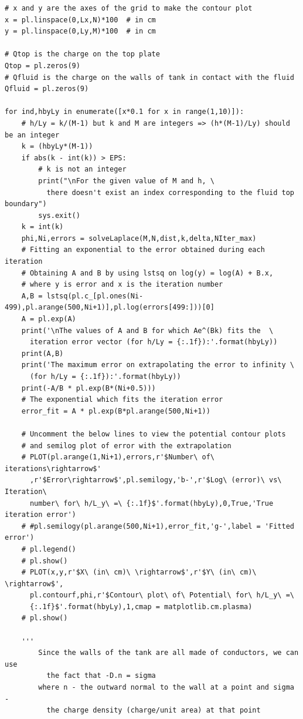 \documentclass[11pt, a4paper]{article}
\begin{document}
\begin{verbatim}
# x and y are the axes of the grid to make the contour plot
x = pl.linspace(0,Lx,N)*100  # in cm
y = pl.linspace(0,Ly,M)*100  # in cm

# Qtop is the charge on the top plate
Qtop = pl.zeros(9)
# Qfluid is the charge on the walls of tank in contact with the fluid
Qfluid = pl.zeros(9)

for ind,hbyLy in enumerate([x*0.1 for x in range(1,10)]):
    # h/Ly = k/(M-1) but k and M are integers => (h*(M-1)/Ly) should be an integer
    k = (hbyLy*(M-1))
    if abs(k - int(k)) > EPS:
        # k is not an integer
        print("\nFor the given value of M and h, \
          there doesn't exist an index corresponding to the fluid top boundary")
        sys.exit()
    k = int(k)
    phi,Ni,errors = solveLaplace(M,N,dist,k,delta,NIter_max)
    # Fitting an exponential to the error obtained during each iteration
    # Obtaining A and B by using lstsq on log(y) = log(A) + B.x,  
    # where y is error and x is the iteration number
    A,B = lstsq(pl.c_[pl.ones(Ni-499),pl.arange(500,Ni+1)],pl.log(errors[499:]))[0]
    A = pl.exp(A)
    print('\nThe values of A and B for which Ae^(Bk) fits the  \
      iteration error vector (for h/Ly = {:.1f}):'.format(hbyLy))
    print(A,B)
    print('The maximum error on extrapolating the error to infinity \
      (for h/Ly = {:.1f}):'.format(hbyLy))
    print(-A/B * pl.exp(B*(Ni+0.5)))
    # The exponential which fits the iteration error
    error_fit = A * pl.exp(B*pl.arange(500,Ni+1))

    # Uncomment the below lines to view the potential contour plots 
    # and semilog plot of error with the extrapolation
    # PLOT(pl.arange(1,Ni+1),errors,r'$Number\ of\ iterations\rightarrow$' 
      ,r'$Error\rightarrow$',pl.semilogy,'b-',r'$Log\ (error)\ vs\ Iteration\
      number\ for\ h/L_y\ =\ {:.1f}$'.format(hbyLy),0,True,'True iteration error')
    # #pl.semilogy(pl.arange(500,Ni+1),error_fit,'g-',label = 'Fitted error')
    # pl.legend()
    # pl.show()
    # PLOT(x,y,r'$X\ (in\ cm)\ \rightarrow$',r'$Y\ (in\ cm)\ \rightarrow$',  
      pl.contourf,phi,r'$Contour\ plot\ of\ Potential\ for\ h/L_y\ =\ 
      {:.1f}$'.format(hbyLy),1,cmap = matplotlib.cm.plasma)
    # pl.show()

    '''
        Since the walls of the tank are all made of conductors, we can use 
          the fact that -D.n = sigma
        where n - the outward normal to the wall at a point and sigma - 
          the charge density (charge/unit area) at that point


\end{verbatim}
\end{document}
